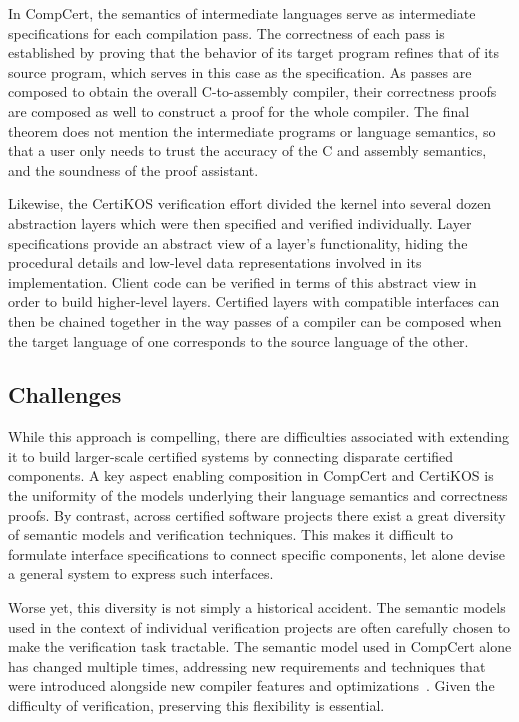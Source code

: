 \documentclass[draft,11pt]{report}
\begin{document}
In CompCert,
the semantics of intermediate languages
serve as intermediate specifications for each compilation pass.
The correctness of each pass is established by
proving that the behavior of its target program
refines that of its source program,
which serves in this case as the specification.
As passes are composed to obtain the overall
C-to-assembly compiler,
their correctness proofs are composed as well
to construct a proof for the whole compiler.
The final theorem does not mention the intermediate
programs or language semantics,
so that a user only needs to trust
the accuracy of the C and assembly semantics,
and the soundness of the proof assistant.

Likewise,
the CertiKOS verification effort
divided the kernel into several dozen abstraction layers
which were then specified and verified individually.
Layer specifications provide
an abstract view of a layer's functionality,
hiding the procedural details and low-level data representations
involved in its implementation.
Client code can be verified in terms of
this abstract view
in order to build higher-level layers.
Certified layers
with compatible interfaces can then be chained together
in the way passes of a compiler
can be composed when the target language of one
corresponds to the source language of the other.


\subsection{Challenges} %

While this approach is compelling,
there are difficulties associated with extending it
to build larger-scale certified systems
by connecting disparate certified components.
A key aspect enabling composition in CompCert and CertiKOS
is the uniformity of the models underlying
their language semantics and correctness proofs.
By contrast,
across certified software projects
there exist a great diversity
of semantic models and verification techniques.
This makes it difficult to formulate
interface specifications to connect specific components,
let alone devise a general system
to express such interfaces.

Worse yet,
this diversity is not simply a historical accident.
The semantic models
used in the context of individual verification projects
are often carefully chosen
to make the verification task tractable.
The semantic model used in CompCert alone
has changed multiple times,
addressing new requirements and techniques
that were introduced alongside
new compiler features and optimizations~\citep{compsem}.
Given the difficulty of verification,
preserving this flexibility is essential.
\end{document}
